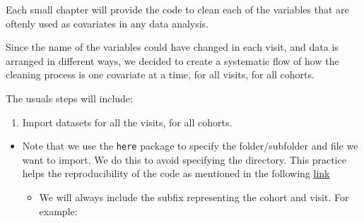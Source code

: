 \documentclass[]{book}
\providecommand{\tightlist}{%
  \setlength{\itemsep}{0pt}\setlength{\parskip}{0pt}}
\begin{document}
Each small chapter will provide the code to clean each of the variables that are oftenly used as covariates in any data analysis.

Since the name of the variables could have changed in each visit, and data is arranged in different ways, we decided to create a systematic flow of how the cleaning process is one covariate at a time, for all visits, for all cohorts.

The usuals steps will include:

\begin{enumerate}
\def\labelenumi{\arabic{enumi}.}
\tightlist
\item
  Import datasets for all the visits, for all cohorts.
\end{enumerate}

\begin{itemize}
\item
  Note that we use the \texttt{here} package to specify the folder/subfolder and file we want to import. We do this to avoid specifying the directory. This practice helps the reproducibility of the code as mentioned in the following \href{https://www.tidyverse.org/articles/2017/12/workflow-vs-script/}{link}

  \begin{itemize}
  \tightlist
  \item
    We will always include the subfix representing the cohort and visit. For example:
  \end{itemize}
\end{itemize}
\end{document}
